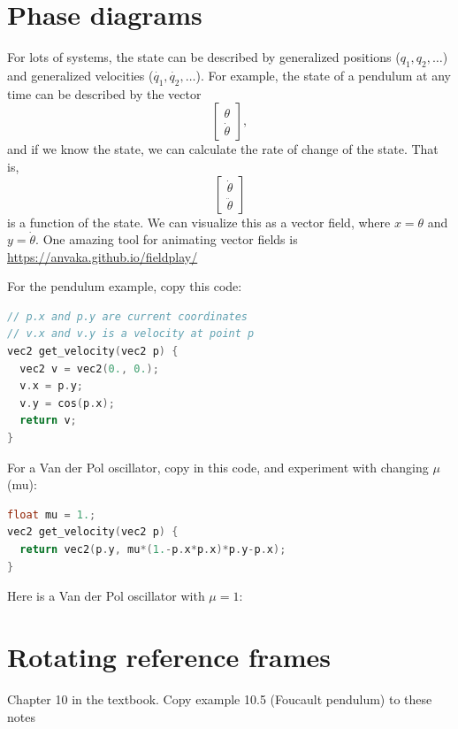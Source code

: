 \documentclass{article}
\begin{document}
\section{Phase diagrams}
For lots of systems, the state can be described by generalized positions ($q_1, q_2, \dots$) and generalized velocities ($\dot{q_1}, \dot{q_2}, \dots$). For example, the state of a pendulum at any time can be described by the vector
\[ \begin{bmatrix}
    \theta \\
    \dot{\theta}
\end{bmatrix}, \]
and if we know the state, we can calculate the rate of change of the state. That is,
\[ \begin{bmatrix}
    \dot{\theta} \\
    \ddot{\theta}
\end{bmatrix} \]
is a function of the state. We can visualize this as a vector field, where $x = \theta$ and $y = \dot{\theta}$. One amazing tool for animating vector fields is
\url{https://anvaka.github.io/fieldplay/}
\par
For the pendulum example, copy this code:
\begin{lstlisting}[language=C,frame=single]
// p.x and p.y are current coordinates
// v.x and v.y is a velocity at point p
vec2 get_velocity(vec2 p) {
  vec2 v = vec2(0., 0.);
  v.x = p.y;
  v.y = cos(p.x);
  return v;
}
\end{lstlisting}

For a Van der Pol oscillator, copy in this code, and experiment with changing $\mu$ (mu):
\begin{lstlisting}[language=C,frame=single]
float mu = 1.;
vec2 get_velocity(vec2 p) {
  return vec2(p.y, mu*(1.-p.x*p.x)*p.y-p.x);
}
\end{lstlisting}
Here is a Van der Pol oscillator with $\mu = 1$:

\section{Rotating reference frames}
Chapter 10 in the textbook. Copy example 10.5 (Foucault pendulum) to these notes
\end{document}
